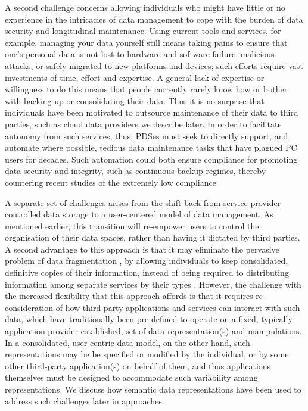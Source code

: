 \documentclass[graybox]{svmult}
\begin{document}
A second challenge concerns allowing individuals who might have little or no experience in the intricacies of data management to cope with the burden of data security and longitudinal maintenance.  Using current tools and services, for example, managing your data yourself still means taking pains to ensure that one's personal data is not lost to hardware and software failure, malicious attacks, or safely migrated to new platforms and devices; such efforts require vast investments of time, effort and expertise.  A general lack of expertise or willingness to do this  means that people currently rarely know how or bother with backing up or consolidating their data. Thus it is no surprise that individuals have been motivated to outsource maintenance of their data to third parties, such as cloud data providers we describe later.  In order to facilitate autonomy from such services, thus, PDSes must seek to directly support, and automate where possible, tedious data maintenance tasks that have plagued PC users for decades.  Such automation could both ensure compliance for promoting data security and integrity, such as continuous backup regimes, thereby countering recent studies of the extremely low compliance 

A separate set of challenges arises from the shift back from service-provider controlled data storage to a user-centered model of data management. As mentioned earlier, this transition will re-empower users to control the organisation of their data spaces, rather than having it dictated by third parties.  A second advantage to this approach is that it may eliminate the pervasive problem of data fragmentation \cite{jones}, by allowing individuals to keep consolidated, definitive copies of their information, instead of being required to distributing information among separate services by their types \cite{web-fragmentation}.  However, the challenge with the increased flexibility that this approach affords is that it requires re-consideration of how third-party applications and services can interact with such data, which have traditionally been pre-defined to operate on a fixed, typically application-provider established, set of data representation(s) and manipulations.  In a consolidated, user-centric data model, on the other hand, such representations may be be specified or modified by the individual, or by some other third-party application(s) on behalf of them, and thus applications themselves must be designed to accommodate such variability among representations.  We discuss how semantic data representations have been used to address such challenges later in approaches.
\end{document}
